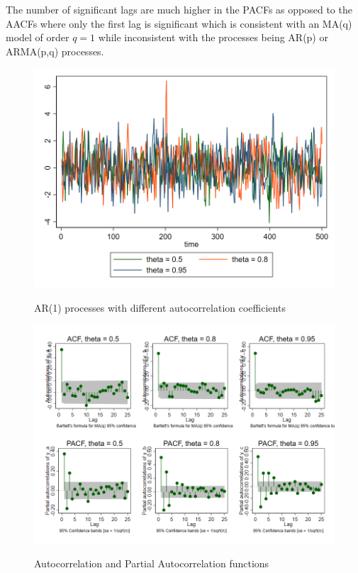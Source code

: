 The number of significant lags are much higher in the PACFs as opposed to the AACFs where only the first lag is significant which is consistent with an MA(q) model of order $q=1$ while inconsistent with the processes being AR(p) or ARMA(p,q) processes.
\begin{figure}[H]
  \caption{AR(1) processes with different autocorrelation coefficients}
  \includegraphics[width= \textwidth]{03_figures/fig2c}
  \label{fig:ma1}
  \vspace{-1cm}
\end{figure}
\begin{figure}[H]
  \caption{Autocorrelation and Partial Autocorrelation functions}
  \includegraphics[width= \textwidth]{03_figures/fig2c_ac}
  \label{fig:ma1_acf}
  \vspace{-1cm}
\end{figure}
